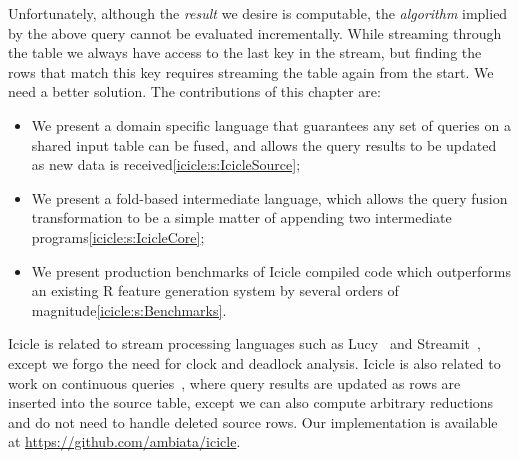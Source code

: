 Unfortunately, although the \emph{result} we desire is computable, the \emph{algorithm} implied by the above query cannot be evaluated incrementally. While streaming through the table we always have access to the last key in the stream, but finding the rows that match this key requires streaming the table again from the start. We need a better solution. The contributions of this chapter are:
\begin{itemize}
\item
We present a domain specific language that guarantees any set of queries on a shared input table can be fused, and allows the query results to be updated as new data is received\autoref{icicle:s:IcicleSource};

\item
We present a fold-based intermediate language, which allows the query fusion transformation to be a simple matter of appending two intermediate programs\autoref{icicle:s:IcicleCore};

\item
We present production benchmarks of Icicle compiled code which outperforms an existing R feature generation system by several orders of magnitude\autoref{icicle:s:Benchmarks}. 
\end{itemize}


Icicle is related to stream processing languages such as Lucy~\cite{mandel2010lucy} and Streamit~\cite{thies2002streamit}, except we forgo the need for clock and deadlock analysis. Icicle is also related to work on continuous queries~\cite{arasu2003cql}, where query results are updated as rows are inserted into the source table, except we can also compute arbitrary reductions and do not need to handle deleted source rows. Our implementation is available at \url{https://github.com/ambiata/icicle}.
